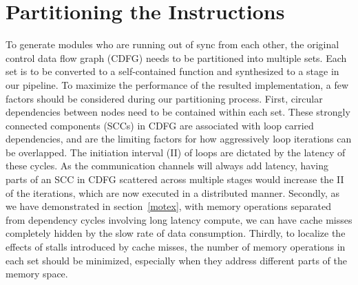 \section{Partitioning the Instructions}
\label{sec:partins}
To generate modules who are running out of sync from each other, the original
control data flow graph (CDFG) needs to be partitioned into multiple sets.
Each set is to be converted to a self-contained function and synthesized to
a stage in our pipeline.
To maximize the performance of the resulted implementation, a few factors
should be considered during our partitioning process. 
First, circular dependencies between
nodes need to be contained within each set. These strongly
connected components (SCCs) in CDFG are associated with
loop carried dependencies, and are the limiting factors for how
aggressively loop iterations can be overlapped. The initiation
interval (II) of loops are dictated by the latency of these cycles.
As the communication channels will always add latency,
having parts of an SCC in CDFG scattered across multiple
stages would increase the II of the iterations, which are now
executed in a distributed manner. 
Secondly, as we have demonstrated in section~\ref{motex}, with memory operations separated
from dependency cycles involving long latency compute, we
can have cache misses completely hidden by the slow rate
of data consumption.
Thirdly, to
localize the effects of stalls introduced by cache misses, the
number of memory operations in each set should be
minimized, especially when they address different parts of the
memory space.



 


